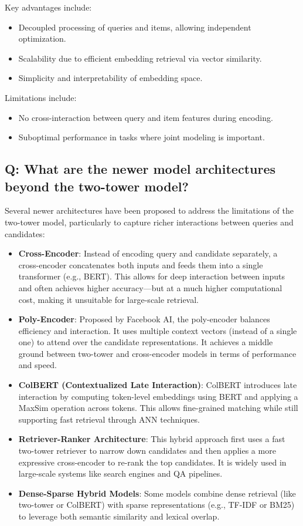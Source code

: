 \documentclass[11pt]{article}
\begin{document}
Key advantages include:
\begin{itemize}
	\item Decoupled processing of queries and items, allowing independent optimization.
	\item Scalability due to efficient embedding retrieval via vector similarity.
	\item Simplicity and interpretability of embedding space.
\end{itemize}

Limitations include:
\begin{itemize}
	\item No cross-interaction between query and item features during encoding.
	\item Suboptimal performance in tasks where joint modeling is important.
\end{itemize}

\subsection*{Q: What are the newer model architectures beyond the two-tower model?}
Several newer architectures have been proposed to address the limitations of the two-tower model, particularly to capture richer interactions between queries and candidates:

\begin{itemize}
	\item \textbf{Cross-Encoder}: Instead of encoding query and candidate separately, a cross-encoder concatenates both inputs and feeds them into a single transformer (e.g., BERT). This allows for deep interaction between inputs and often achieves higher accuracy—but at a much higher computational cost, making it unsuitable for large-scale retrieval.

	\item \textbf{Poly-Encoder}: Proposed by Facebook AI, the poly-encoder balances efficiency and interaction. It uses multiple context vectors (instead of a single one) to attend over the candidate representations. It achieves a middle ground between two-tower and cross-encoder models in terms of performance and speed.

	\item \textbf{ColBERT (Contextualized Late Interaction)}: ColBERT introduces late interaction by computing token-level embeddings using BERT and applying a MaxSim operation across tokens. This allows fine-grained matching while still supporting fast retrieval through ANN techniques.

	\item \textbf{Retriever-Ranker Architecture}: This hybrid approach first uses a fast two-tower retriever to narrow down candidates and then applies a more expressive cross-encoder to re-rank the top candidates. It is widely used in large-scale systems like search engines and QA pipelines.

	\item \textbf{Dense-Sparse Hybrid Models}: Some models combine dense retrieval (like two-tower or ColBERT) with sparse representations (e.g., TF-IDF or BM25) to leverage both semantic similarity and lexical overlap.
\end{itemize}
\end{document}
